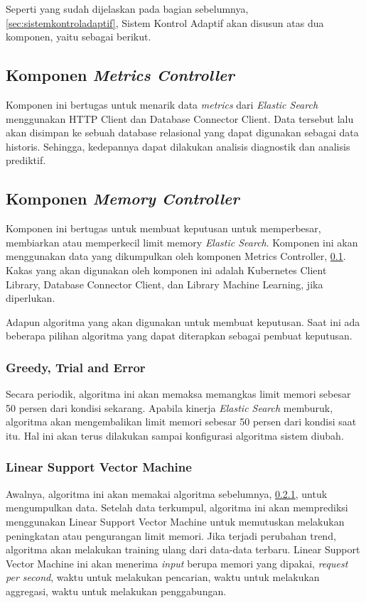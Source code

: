 Seperti yang sudah dijelaskan pada bagian sebelumnya, \ref{sec:sistemkontroladaptif}, Sistem Kontrol Adaptif akan disusun atas dua komponen, yaitu sebagai berikut.
\subsection{Komponen \textit{Metrics Controller}}
\label{sec:metricscontroller}

Komponen ini bertugas untuk menarik data \textit{metrics} dari \textit{Elastic Search} menggunakan HTTP Client dan Database Connector Client. Data tersebut lalu akan disimpan ke sebuah database relasional yang dapat digunakan sebagai data historis. Sehingga, kedepannya dapat dilakukan analisis diagnostik dan analisis prediktif.

\subsection{Komponen \textit{Memory Controller}}

Komponen ini bertugas untuk membuat keputusan untuk memperbesar, membiarkan atau memperkecil limit memory \textit{Elastic Search}. Komponen ini akan menggunakan data yang dikumpulkan oleh komponen Metrics Controller, \ref{sec:metricscontroller}. Kakas yang akan digunakan oleh komponen ini adalah Kubernetes Client Library, Database Connector Client, dan Library Machine Learning, jika diperlukan.

Adapun algoritma yang akan digunakan untuk membuat keputusan. Saat ini ada beberapa pilihan algoritma yang dapat diterapkan sebagai pembuat keputusan.

\subsubsection{Greedy, Trial and Error}
\label{sec:greedytrialerror}

Secara periodik, algoritma ini akan memaksa memangkas limit memori sebesar 50 persen dari kondisi sekarang.
Apabila kinerja \textit{Elastic Search} memburuk, algoritma akan mengembalikan limit memori sebesar 50 persen dari kondisi saat itu.
Hal ini akan terus dilakukan sampai konfigurasi algoritma sistem diubah.

\subsubsection{Linear Support Vector Machine}

Awalnya, algoritma ini akan memakai algoritma sebelumnya, \ref{sec:greedytrialerror}, untuk mengumpulkan data.
Setelah data terkumpul, algoritma ini akan memprediksi menggunakan Linear Support Vector Machine untuk memutuskan melakukan peningkatan atau pengurangan limit memori.
Jika terjadi perubahan trend, algoritma akan melakukan training ulang dari data-data terbaru.
Linear Support Vector Machine ini akan menerima \textit{input} berupa memori yang dipakai, \textit{request per second}, waktu untuk melakukan pencarian, waktu untuk melakukan aggregasi, waktu untuk melakukan penggabungan.